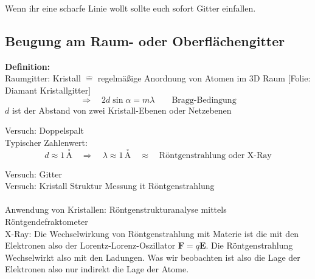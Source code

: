 \documentclass[titlepage,11pt,a4paper,ngerman]{report}
\newcommand{\tx}[1]{\textrm{#1}}
\newcommand{\folie}[1]{\color{gray}[Folie: #1]\color{black}}
\newcommand{\versuch}[1]{\color{red!50!black} Versuch: \color{black} #1\\ }
\renewcommand{\vec}[1]{\boldsymbol{#1}}
\newcommand{\lcom}[1]{\color{MidnightBlue}#1\color{black}}
\begin{document}
\lcom{Wenn ihr eine scharfe Linie wollt sollte euch sofort Gitter einfallen. }

\subsection{Beugung am Raum- oder Oberflächengitter}

\textbf{Definition:}\\
Raumgitter: Kristall $ \widehat{=} $ regelmäßige Anordnung von Atomen im 3D Raum \folie{Diamant Kristallgitter}
\begin{equation*}
\Rightarrow \quad 2 d \sin \alpha = m \lambda \qquad \tx{Bragg-Bedingung}
\end{equation*}
$ d $ ist der Abstand von zwei Kristall-Ebenen oder Netzebenen 

\versuch{Doppelspalt}

\noindent
Typischer Zahlenwert:
\begin{equation*}
d \approx 1 \, \overset{\circ}{\tx{A}} \quad \Rightarrow \quad \lambda \approx 1 \, \overset{\circ}{\tx{A}} \quad \approx \quad \tx{Röntgenstrahlung oder X-Ray}
\end{equation*}

\versuch{Gitter}
\versuch{Kristall Struktur Messung it Röntgenstrahlung}\\
Anwendung von Kristallen: Röntgenstrukturanalyse mittels Röntgendefraktometer\\
X-Ray: \lcom{Die Wechselwirkung von Röntgenstrahlung mit Materie ist die mit den Elektronen also der Lorentz-Lorenz-Oszillator $ \vec{F} = q \vec{E} $. Die Röntgenstrahlung Wechselwirkt also mit den Ladungen. Was wir beobachten ist also die Lage der Elektronen also nur indirekt die Lage der Atome.}




%
%
\end{document}
